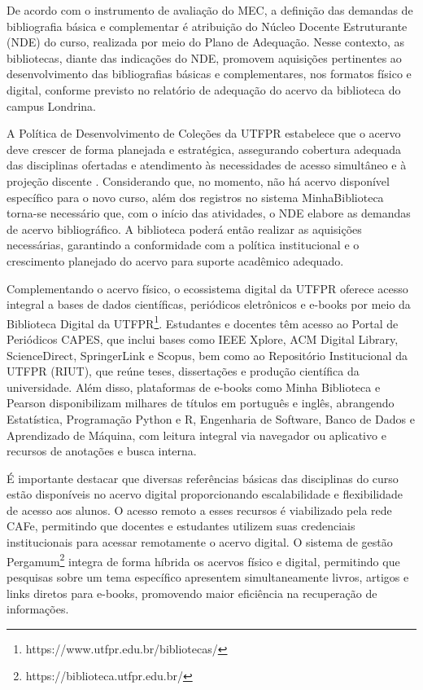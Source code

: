 De acordo com o instrumento de avaliação do MEC, a definição das demandas de bibliografia básica e complementar é atribuição do Núcleo Docente Estruturante (NDE) do curso, realizada por meio do Plano de Adequação. Nesse contexto, as bibliotecas, diante das indicações do NDE, promovem aquisições pertinentes ao desenvolvimento das bibliografias básicas e complementares, nos formatos físico e digital, conforme previsto no relatório de adequação do acervo da biblioteca do campus Londrina.

A Política de Desenvolvimento de Coleções da UTFPR estabelece que o acervo deve crescer de forma planejada e estratégica, assegurando cobertura adequada das disciplinas ofertadas e atendimento às necessidades de acesso simultâneo e à projeção discente \cite{utfpr_ppdc}. Considerando que, no momento, não há acervo disponível específico para o novo curso, além dos registros no sistema MinhaBiblioteca  torna-se necessário que, com o início das atividades, o NDE elabore as demandas de acervo bibliográfico. A biblioteca poderá então realizar as aquisições necessárias, garantindo a conformidade com a política institucional e o crescimento planejado do acervo para suporte acadêmico adequado.

Complementando o acervo físico, o ecossistema digital da UTFPR oferece acesso integral a bases de dados científicas, periódicos eletrônicos e e-books por meio da Biblioteca Digital da UTFPR\footnote{https://www.utfpr.edu.br/bibliotecas/}. Estudantes e docentes têm acesso ao Portal de Periódicos CAPES, que inclui bases como IEEE Xplore, ACM Digital Library, ScienceDirect, SpringerLink e Scopus, bem como ao Repositório Institucional da UTFPR (RIUT), que reúne teses, dissertações e produção científica da universidade. Além disso, plataformas de e-books como Minha Biblioteca e Pearson disponibilizam milhares de títulos em português e inglês, abrangendo Estatística, Programação Python e R, Engenharia de Software, Banco de Dados e Aprendizado de Máquina, com leitura integral via navegador ou aplicativo e recursos de anotações e busca interna.

É importante destacar que diversas referências básicas das disciplinas do curso estão disponíveis no acervo digital proporcionando escalabilidade e flexibilidade de acesso aos alunos. O acesso remoto a esses recursos é viabilizado pela rede CAFe, permitindo que docentes e estudantes utilizem suas credenciais institucionais para acessar remotamente o acervo digital. O sistema de gestão Pergamum\footnote{https://biblioteca.utfpr.edu.br/} integra de forma híbrida os acervos físico e digital, permitindo que pesquisas sobre um tema específico apresentem simultaneamente livros, artigos e links diretos para e-books, promovendo maior eficiência na recuperação de informações.

